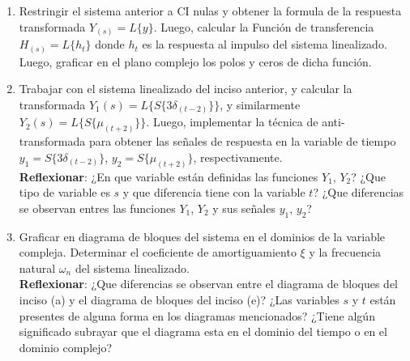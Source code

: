 \documentclass[12pt,a4paper]{report}
\begin{document}
\begin{enumerate}[label=\alph*)]
  \item Restringir el sistema anterior a CI nulas y obtener la formula de la respuesta transformada $Y_{(s)} = L\{y\}$. Luego, calcular la Función de transferencia $H_{(s)} = L\{h_t\}$ donde $h_t$ es la respuesta al impulso del sistema linealizado. Luego, graficar en el plano complejo los polos y ceros de dicha función.

  \item Trabajar con el sistema linealizado del inciso anterior, y calcular la transformada $Y_1(s) = L\{S\{3\delta_{(t-2)}\}\}$, y similarmente $Y_2(s) = L\{S\{\mu_{(t+2)}\}\}$. Luego, implementar la técnica de anti-transformada para obtener las señales de respuesta en la variable de tiempo $y_1 = S\{3\delta_{(t-2)}\}$, $y_2 = S\{\mu_{(t+2)}\}$, respectivamente.\\
  \textbf{Reflexionar}: ¿En que variable están definidas las funciones $Y_1$, $Y_2$? ¿Que tipo de variable es $s$ y que diferencia tiene con la variable $t$? ¿Que diferencias se observan entres las funciones $Y_1$, $Y_2$ y sus señales $y_1$, $y_2$?

  \item Graficar en diagrama de bloques del sistema en el dominios de la variable compleja.  Determinar el coeficiente de amortiguamiento $\xi$ y la frecuencia natural $\omega_n$ del sistema linealizado.\\
  \textbf{Reflexionar}: ¿Que diferencias se observan entre el diagrama de bloques del inciso (a) y el diagrama de bloques del inciso (e)? ¿Las variables $s$ y $t$ están presentes de alguna forma en los diagramas mencionados? ¿Tiene algún significado subrayar que el diagrama esta en el dominio del tiempo o en el dominio complejo?

  \end{enumerate}
\end{document}
